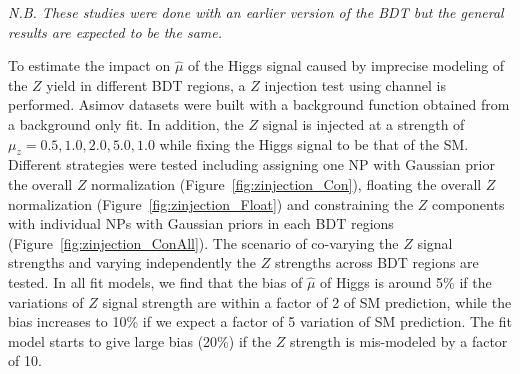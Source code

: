 

{\it N.B. These studies were done with an earlier version of the BDT but the general results are expected to be the same.}

To estimate the impact on $\hat \mu$ of the Higgs signal caused by imprecise modeling of the $Z$ yield in different BDT regions, a $Z$ injection test using \twocentral channel is performed. Asimov datasets were built with a background function obtained from a background only fit.  In addition, the $Z$ signal is injected at a strength of $\mu_z= 0.5, 1.0, 2.0, 5.0, 1.0$ while fixing the Higgs signal to be that of the SM. Different strategies were tested including assigning one NP with Gaussian prior the overall $Z$ normalization (Figure~\ref{fig:zinjection_Con}), floating the overall $Z$ normalization (Figure~\ref{fig:zinjection_Float}) and constraining the $Z$ components with individual NPs with Gaussian priors in each BDT regions (Figure~\ref{fig:zinjection_ConAll}). The scenario of co-varying the $Z$ signal strengths and varying independently the $Z$ strengths across BDT regions are tested. In all fit models, we find that the bias of $\hat \mu$ of Higgs is around 5\% if the variations of $Z$ signal strength are within a factor of 2 of SM prediction, while the bias increases to 10\% if we expect a factor of 5 variation of SM prediction. The fit model starts to give large bias (20\%) if the $Z$ strength is mis-modeled by a factor of 10. 

